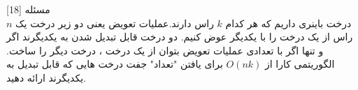 
‌مسئله [18]
\\
$n$ درخت باینری داریم که هر کدام $k$ راس دارند.عملیات تعویض یعنی دو زیر درخت یک راس از یک درخت را با یکدیگر عوض کنیم. دو درخت قابل تبدیل شدن به یکدیگرند اگر و تنها اگر با تعدادی عملیات تعویض بتوان از یک درخت ، درخت دیگر را ساخت. الگوریتمی کارا از $O(nk)$ برای یافتن "تعداد" جفت درخت هایی که قابل تبدیل به یکدیگرند ارائه دهید.


% 
%
%
% 



